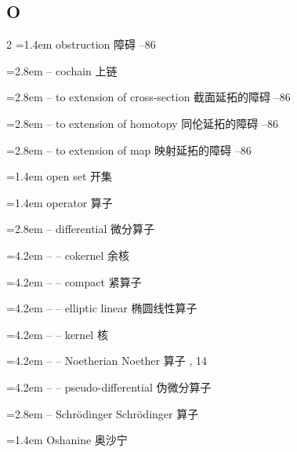 \subsection*{O}
\small
\begin{multicols}{2}
\noindent\hangindent=1.4em obstruction \quad 障碍 --86\par
\noindent\hangindent=2.8em -- cochain \quad 上链 \par
\noindent\hangindent=2.8em -- to extension of cross-section \quad 截面延拓的障碍 --86\par
\noindent\hangindent=2.8em -- to extension of homotopy \quad 同伦延拓的障碍 --86\par
\noindent\hangindent=2.8em -- to extension of map \quad 映射延拓的障碍 --86\par
\noindent\hangindent=1.4em open set \quad 开集 \par
\noindent\hangindent=1.4em operator \quad 算子 \quad\par
\noindent\hangindent=2.8em -- differential \quad 微分算子 \quad\par
\noindent\hangindent=4.2em -- -- cokernel \quad 余核 \par
\noindent\hangindent=4.2em -- -- compact \quad 紧算子 \par
\noindent\hangindent=4.2em -- -- elliptic linear \quad 椭圆线性算子 \par
\noindent\hangindent=4.2em -- -- kernel \quad 核 \par
\noindent\hangindent=4.2em -- -- Noetherian \quad Noether 算子 , 14\par
\noindent\hangindent=4.2em -- -- pseudo-differential \quad 伪微分算子 \par
\noindent\hangindent=2.8em -- Schr\"odinger \quad Schr\"odinger 算子 \par
\noindent\hangindent=1.4em Oshanine \quad 奥沙宁 \par
\end{multicols}

